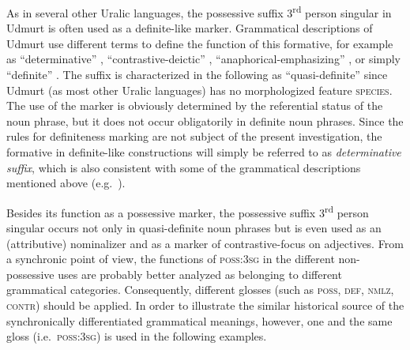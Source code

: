 As in several other Uralic languages, the possessive suffix 3\textsuperscript{rd} person singular in Udmurt is often used as a definite-like marker. Grammatical descriptions of Udmurt use different terms to define the function of this formative, for example as “determinative” \citep{kelmakov-etal1999}, “contrastive-deictic” \citep{alatyrev1970}, “anaphorical-emphasizing” \citep{kiekbaev1965}, or simply “definite” \citep{winkler2001}. The suffix is characterized in the following as “quasi-definite” since Udmurt (as most other Uralic languages) has no morphologized feature \textsc{species}. The use of the marker is obviously determined by the referential status of the noun phrase, but it does not occur obligatorily in definite noun phrases. Since the rules for definiteness marking are not subject of the present investigation, the formative in definite-like constructions will simply be referred to as \textit{determinative suffix}, which is also consistent with some of the grammatical descriptions mentioned above (e.g.~\citealt{kelmakov-etal1999}).

Besides its function as a possessive marker, the possessive suffix 3\textsuperscript{rd} person singular occurs not only in quasi-definite noun phrases but is even used as an (attributive) nominalizer and as a marker of contrastive-focus on adjectives. From a synchronic point of view, the functions of \textsc{poss:3sg} in the different non-possessive uses are probably better analyzed as belonging to different grammatical categories. Consequently, different glosses (such as \textsc{poss, def, nmlz, contr}) should be applied. In order to illustrate the similar historical source of the synchronically differentiated grammatical meanings, however, one and the same gloss (i.e.~\textsc{poss:3sg}) is used in the following examples.

